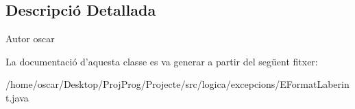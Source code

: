 \subsection{Descripció Detallada}
\begin{DoxyAuthor}{Autor}
oscar 
\end{DoxyAuthor}


La documentació d'aquesta classe es va generar a partir del següent fitxer\+:\begin{DoxyCompactItemize}
\item 
/home/oscar/\+Desktop/\+Proj\+Prog/\+Projecte/src/logica/excepcions/E\+Format\+Laberint.\+java\end{DoxyCompactItemize}

